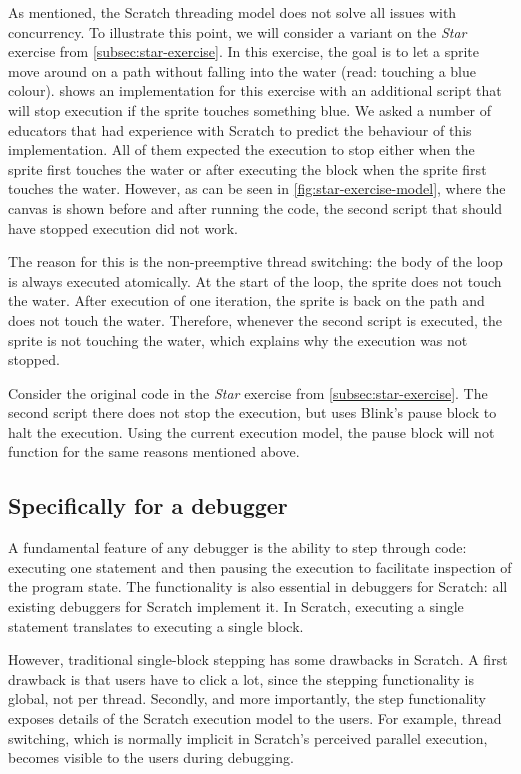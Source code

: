 \documentclass[../main]{subfiles}
\begin{document}
As \textcite{maloneyScratchProgrammingLanguage2010} mentioned, the Scratch threading model does not solve all issues with concurrency.
To illustrate this point, we will consider a variant on the \emph{Star} exercise from \cref{subsec:star-exercise}.
In this exercise, the goal is to let a sprite move around on a path without falling into the water (read: touching a blue colour).
 shows an implementation for this exercise with an additional script that will stop execution if the sprite touches something blue.
We asked a number of educators that had experience with Scratch to predict the behaviour of this implementation.
All of them expected the execution to stop either when the sprite first touches the water or after executing the block when the sprite first touches the water.
However, as can be seen in \cref{fig:star-exercise-model}, where the canvas is shown before and after running the code, the second script that should have stopped execution did not work.

The reason for this is the non-preemptive thread switching: the body of the loop is always executed atomically.
At the start of the loop, the sprite does not touch the water.
After execution of one iteration, the sprite is back on the path and does not touch the water.
Therefore, whenever the second script is executed, the sprite is not touching the water, which explains why the execution was not stopped.

Consider the original code in the \emph{Star} exercise from \cref{subsec:star-exercise}.
The second script there does not stop the execution, but uses Blink's pause block to halt the execution.
Using the current execution model, the pause block will not function for the same reasons mentioned above.

\subsection{Specifically for a debugger}\label{subsec:specifically-for-a-debugger}

A fundamental feature of any debugger is the ability to step through code: executing one statement and then pausing the execution to facilitate inspection of the program state.
The functionality is also essential in debuggers for Scratch: all existing debuggers for Scratch implement it.
In Scratch, executing a single statement translates to executing a single block.

However, traditional single-block stepping has some drawbacks in Scratch.
A first drawback is that users have to click a lot, since the stepping functionality is global, not per thread.
Secondly, and more importantly, the step functionality exposes details of the Scratch execution model to the users.
For example, thread switching, which is normally implicit in Scratch's perceived parallel execution, becomes visible to the users during debugging.
\end{document}
